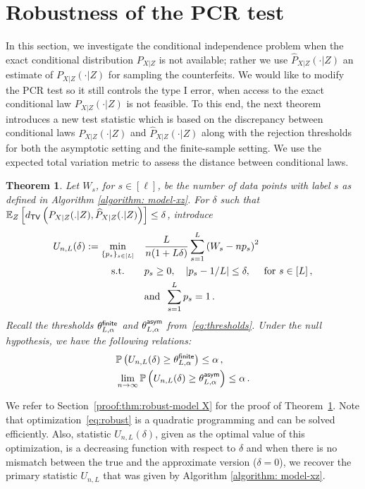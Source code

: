 \documentclass[11pt]{article}
\newtheorem{thm}[propo]{Theorem}
\def\hP{\widehat{P}}
\def\tv{\mathsf{TV}}
\begin{document}
\section{Robustness of the PCR test}\label{sec:robust}
In this section, we investigate the conditional independence problem when the exact conditional distribution $P_{X|Z}$ is not available; rather we use $\hP_{X|Z}(\cdot|Z)$  an estimate of $P_{X|Z}(\cdot|Z)$ for sampling the counterfeits. We would like to modify the PCR test so it still controls the type I error, when access to the exact conditional law $P_{X|Z}(\cdot|Z)$ is not feasible. To this end, the next theorem introduces a new test statistic which is based on the discrepancy between conditional laws $P_{X|Z}(\cdot|Z)$ and  $\hP_{X|Z}(\cdot|Z)$ along with the rejection thresholds for both the asymptotic setting and the finite-sample setting. We use the expected total variation metric to assess the distance between conditional laws. 
%
\begin{thm}\label{thm:robust-model X}
Let $W_s$, for $s\in [\ell]$, be the number of  data points with label $s$ as defined in Algorithm \ref{algorithm: model-xz}. For $\delta$ such that $\E_{Z}\left[d_{\tv}\left(P_{X|Z}(.|Z),\hP_{X|Z}(.|Z)  \right)\right]\leq \delta$,
introduce
\begin{equation}\label{eq:robust}
	\begin{split}
		U_{n,L}(\delta):=\min_{\{p_s\}_{s\in[L]}} \quad & \frac{L}{n(1+L\delta)}\sum\limits_{s=1}^{L}{\left(W_s-np_s\right)^2}\\
		{\rm s.t.} \quad\quad  &p_s\geq 0,\quad  |p_s-1/{L}|\leq \delta,\quad \textrm{ for } s\in[L]\,,\\
		&{\rm and }\;\;\sum\limits_{s=1}^{L}p_s=1\,. \\
	\end{split}
	\end{equation}
Recall the thresholds $\theta^{\mathsf{finite}}_{L,\alpha} $ and $\theta^{\mathsf{asym}}_{L,\alpha}$ from~\eqref{eq:thresholds}. Under the null hypothesis, we have the following relations:
\begin{align}
&{\mathbb P}\left( U_{n,L}(\delta) \geq  \theta^{\mathsf{finite}}_{L,\alpha}   \right) \leq \alpha\,,\label{eq:robust-fin}\\
&\lim\limits_{n\rightarrow \infty}^{}  {\mathbb P}\left( U_{n,L}(\delta) \geq \theta^{\mathsf{asym}}_{L,\alpha} \right) \leq \alpha\,.\label{eq:robust-asym}
\end{align}
 \end{thm}
We refer to Section~\ref{proof:thm:robust-model X} for the proof of Theorem~\ref{thm:robust-model X}.
Note that optimization~\eqref{eq:robust} is a quadratic programming and can be solved efficiently. Also, statistic $U_{n,L}(\delta)$, given as the optimal value of this optimization, is a decreasing function with respect to $\delta$ and when there is no mismatch between the true and the approximate version ($\delta = 0$), we recover the primary statistic $U_{n,L}$ that was given by Algorithm \ref{algorithm: model-xz}.
\end{document}
